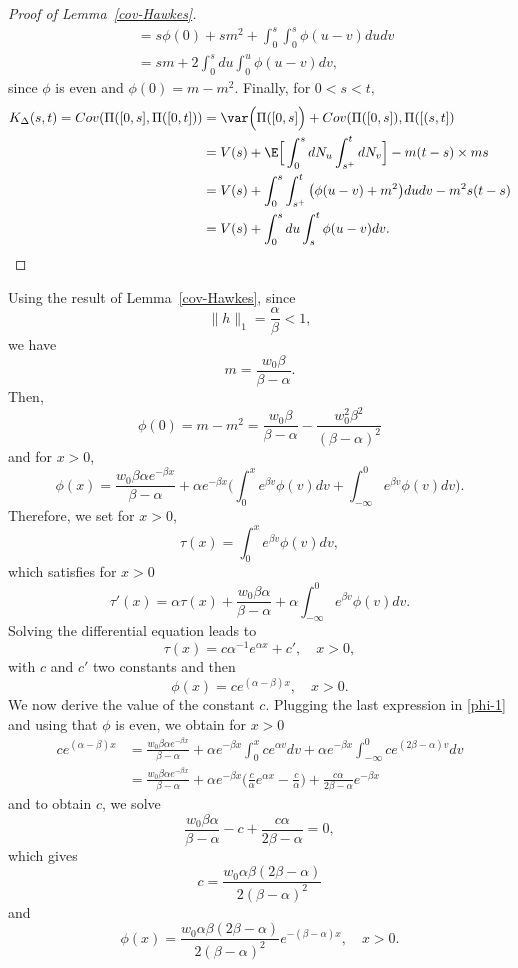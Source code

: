 \documentclass[aos]{imsart}
\theoremstyle{plain}
\theoremstyle{remark}
\newcommand{\1}{1}
\begin{document}
\begin{proof}[Proof of Lemma~\ref{cov-Hawkes}]
\begin{align*}
&=s\phi(0)+sm^2+\int_0^s\int_0^s\phi(u-v)dudv\\
&=sm+2\int_0^sdu\int_0^u\phi(u-v)dv,
\end{align*}
since $\phi$ is even and $\phi(0)=m-m^2.$ Finally, for $0<s< t,$
\begin{align*}
K_\Delta(s,t)={\rm Cov}(\Pi([0,s],\Pi([0,t]))&=\var\Big(\Pi([0,s]\Big)+{\rm Cov}(\Pi([0,s]),\Pi([(s,t])\\
&=V(s)+\E\Big[\int_0^sdN_u\int_{s^+}^tdN_v\Big]-m(t-s)\times m s\\
&=V(s)+\int_0^s\int_{s^+}^t\big(\phi(u-v)+m^2\big)dudv-m^2s(t-s)\\
&=V(s)+\int_0^sdu\int_s^t\phi(u-v)dv.
\end{align*}
\end{proof}
Using the result of Lemma~\ref{cov-Hawkes}, since 
\[
\|h\|_1=\frac{\alpha}{\beta}<1,
\]
we have
\[
m=\frac{w_0\beta}{\beta-\alpha}.
\]
Then, 
\[
\phi(0)=m-m^2=\frac{w_0\beta}{\beta-\alpha}-\frac{w_0^2\beta^2}{(\beta-\alpha)^2}
\]
and for $x>0$,
\begin{equation}\label{phi-1}
\phi(x)=\frac{w_0\beta\alpha e^{-\beta x}}{\beta-\alpha}+\alpha e^{-\beta x}\Big(\int_0^xe^{\beta v}\phi(v)dv+\int_{-\infty}^0 e^{\beta v}\phi(v)dv\Big).
\end{equation}
Therefore, we set for $x>0$,
\[
\tau(x)=\int_0^x e^{\beta v}\phi(v)dv,
\]
which satisfies for $x>0$
\[
\tau'(x)=\alpha \tau (x)+ \frac{w_0\beta\alpha }{\beta-\alpha}+\alpha\int_{-\infty}^0 e^{\beta v}\phi(v)dv.
\]
Solving the differential equation leads to
\[
\tau(x)=c\alpha^{-1}e^{\alpha x}+c',\quad x>0,
\]
with $c$ and $c'$ two constants and then
\[
\phi(x)=ce^{(\alpha-\beta) x},\quad x>0.
\]
We now derive the value of the constant $c$. Plugging the last expression in \eqref{phi-1} and using that $\phi$ is even, we obtain for $x>0$
\begin{align*}
ce^{(\alpha-\beta) x}&=\frac{w_0\beta\alpha e^{-\beta x}}{\beta-\alpha}+\alpha e^{-\beta x}\int_0^xce^{\alpha v}dv+\alpha e^{-\beta x}\int_{-\infty}^0ce^{(2\beta-\alpha)v}dv\\
&=\frac{w_0\beta\alpha e^{-\beta x}}{\beta-\alpha}+\alpha e^{-\beta x}\Big(\frac{c}{\alpha}e^{\alpha x}-\frac{c}{\alpha}\Big)+\frac{c\alpha}{2\beta-\alpha}e^{-\beta x}
\end{align*}
and to obtain $c$, we solve
\[
\frac{w_0\beta\alpha}{\beta-\alpha}-c+\frac{c\alpha}{2\beta-\alpha}=0,
\]
which gives
\[
c=\frac{w_0\alpha\beta(2\beta-\alpha)}{2(\beta-\alpha)^2}
\]
and
\[
\phi(x)=\frac{w_0\alpha\beta(2\beta-\alpha)}{2(\beta-\alpha)^2}e^{-(\beta-\alpha)x},\quad x>0.
\]
\end{document}
